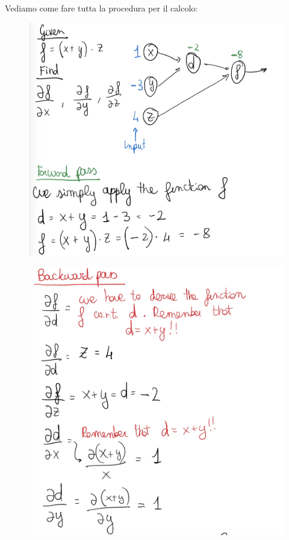 \documentclass[14pt]{extreport}
\begin{document}
Vediamo come fare tutta la procedura per il calcolo:
\begin{figure}[H]
\centering
\includegraphics[width=0.7\linewidth]{392.jpeg}
\end{figure}
\begin{figure}[H]
\centering
\includegraphics[width=\linewidth]{393.jpeg}
\end{figure}
\end{document}
